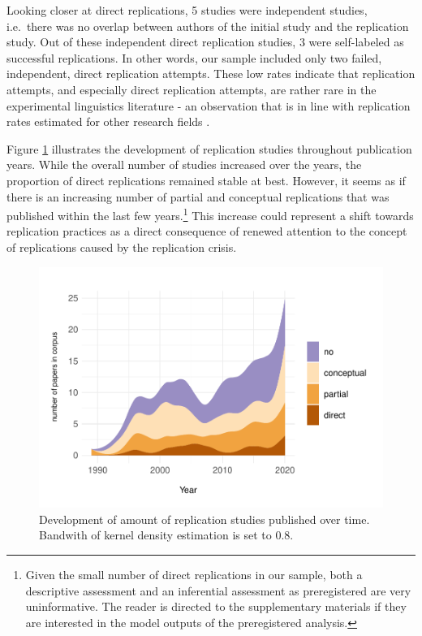 \documentclass[cm,linguex]{glossa}
\begin{document}
Looking closer at direct replications, 5 studies were independent studies, i.e.~there was no overlap between authors of the initial study and the replication study.
Out of these independent direct replication studies, 3 were self-labeled as successful replications.
In other words, our sample included only two failed, independent, direct replication attempts. These low rates indicate that replication attempts, and especially direct replication attempts, are rather rare in the experimental linguistics literature - an observation that is in line with replication rates estimated for other research fields \citep{makel_replications_2012, makel_facts_2014, mueller2019replication}.

Figure \ref{fig:stream-plot} illustrates the development of replication studies throughout publication years.
While the overall number of studies increased over the years, the proportion of direct replications remained stable at best.
However, it seems as if there is an increasing number of partial and conceptual replications that was published within the last few years.\footnote{Given the small number of direct replications in our sample, both a descriptive assessment and an inferential assessment as preregistered are very uninformative. The reader is directed to the supplementary materials if they are interested in the model outputs of the preregistered analysis.}
This increase could represent a shift towards replication practices as a direct consequence of renewed attention to the concept of replications caused by the replication crisis.

\begin{figure}

{\centering \includegraphics[width=1\linewidth]{ReplicationLing_files/figure-latex/stream-plot-1} 

}

\caption{Development of amount of replication studies published over time. Bandwith of kernel density estimation is set to 0.8.}\label{fig:stream-plot}
\end{figure}
\end{document}
